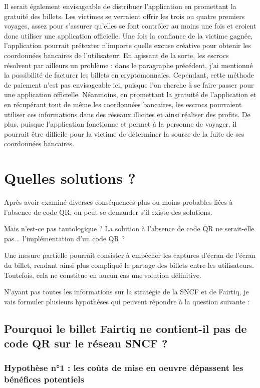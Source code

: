 \documentclass[a4paper]{article}
\begin{document}
Il serait également envisageable de distribuer l'application en promettant la gratuité des billets.
Les victimes se verraient offrir les trois ou quatre premiers voyages, assez pour s'assurer
qu'elles se font contrôler au moins une fois et croient donc utiliser une application officielle.
Une fois la confiance de la victime gagnée, l'application pourrait prétexter n'importe quelle
excuse créative pour obtenir les coordonnées bancaires de l'utilisateur.
En agissant de la sorte, les escrocs résolvent par ailleurs un problème : dans le paragraphe précédent,
j'ai mentionné la possibilité de facturer les billets en cryptomonnaies. Cependant, cette méthode de paiement
n'est pas envisageable ici, puisque l'on cherche à se faire passer pour une application officielle.
Néanmoins, en promettant la gratuité de l'application et en récupérant tout de même les coordonnées bancaires,
les escrocs pourraient utiliser ces informations dans des réseaux illicites et ainsi réaliser des profits.
De plus, puisque l'application fonctionne et permet à la personne de voyager, il pourrait être difficile pour la
victime de déterminer la source de la fuite de ses coordonnées bancaires.


\clearpage

\section{Quelles solutions ?}
Après avoir examiné diverses conséquences plus ou moins probables liées à l'absence de code QR, on peut se demander
s'il existe des solutions.

Mais n'est-ce pas tautologique ? La solution à l'absence de code QR ne serait-elle pas... l'implémentation d'un code QR ?

Une mesure partielle pourrait consister à empêcher les captures d'écran de l'écran du billet, rendant ainsi plus compliqué
le partage des billets entre les utilisateurs. Toutefois, cela ne constitue en aucun cas une solution définitive.

N'ayant pas toutes les informations sur la stratégie de la SNCF et de Fairtiq,
je vais formuler plusieurs hypothèses qui peuvent répondre à la question suivante :
\subsection*{Pourquoi le billet Fairtiq
  ne contient-il pas de code QR sur le réseau SNCF ?}

\subsubsection*{Hypothèse n°1 : les coûts de mise en oeuvre dépassent les bénéfices potentiels}
\end{document}
